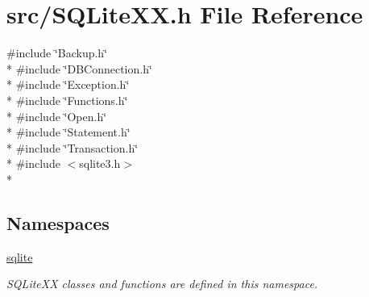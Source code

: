 \hypertarget{a00030}{\section{src/\-S\-Q\-Lite\-X\-X.h File Reference}
\label{a00030}
}
{\ttfamily \#include \char`\"{}Backup.\-h\char`\"{}}\\*
{\ttfamily \#include \char`\"{}D\-B\-Connection.\-h\char`\"{}}\\*
{\ttfamily \#include \char`\"{}Exception.\-h\char`\"{}}\\*
{\ttfamily \#include \char`\"{}Functions.\-h\char`\"{}}\\*
{\ttfamily \#include \char`\"{}Open.\-h\char`\"{}}\\*
{\ttfamily \#include \char`\"{}Statement.\-h\char`\"{}}\\*
{\ttfamily \#include \char`\"{}Transaction.\-h\char`\"{}}\\*
{\ttfamily \#include $<$sqlite3.\-h$>$}\\*
\subsection*{Namespaces}
\begin{DoxyCompactItemize}
\item 
\hyperlink{a00038}{sqlite}
\begin{DoxyCompactList}\small\item\em S\-Q\-Lite\-X\-X classes and functions are defined in this namespace. \end{DoxyCompactList}\end{DoxyCompactItemize}
